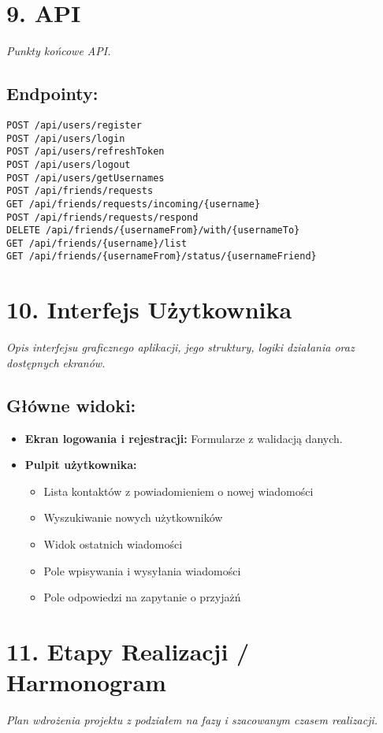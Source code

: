 \documentclass[a4paper,12pt]{article}
\begin{document}
\section*{9. API}
\textit{Punkty końcowe API.}
\vspace{0.5 cm}
 \noindent
\subsection*{Endpointy:}
\begin{verbatim}
POST /api/users/register
POST /api/users/login
POST /api/users/refreshToken
POST /api/users/logout
POST /api/users/getUsernames
POST /api/friends/requests
GET /api/friends/requests/incoming/{username}
POST /api/friends/requests/respond
DELETE /api/friends/{usernameFrom}/with/{usernameTo}
GET /api/friends/{username}/list
GET /api/friends/{usernameFrom}/status/{usernameFriend}
\end{verbatim}

\section*{10. Interfejs Użytkownika}
\textit{Opis interfejsu graficznego aplikacji, jego struktury, logiki działania oraz dostępnych ekranów.}

\vspace{0.5 cm}
 \noindent
\subsection*{Główne widoki:}
\begin{itemize}
    \item \textbf{Ekran logowania i rejestracji:} Formularze z walidacją danych.
    \item \textbf{Pulpit użytkownika:}
    \begin{itemize}
        \item  Lista kontaktów z powiadomieniem o nowej wiadomości
        \item  Wyszukiwanie nowych użytkowników
        \item  Widok ostatnich wiadomości
        \item  Pole wpisywania i wysyłania wiadomości
        \item  Pole odpowiedzi na zapytanie o przyjażń
    \end{itemize}
\end{itemize}

\section*{11. Etapy Realizacji / Harmonogram}
\textit{Plan wdrożenia projektu z podziałem na fazy i szacowanym czasem realizacji.}
\end{document}
